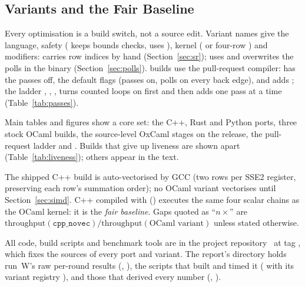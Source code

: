 \subsection{Variants and the Fair Baseline}
Every optimisation is a build switch, not a source edit. Variant names give
the language, safety ( keeps bounds checks,  uses
), kernel ( or four-row ) and
modifiers:  carries row indices by hand (Section~\ref{sec:sr});
 uses  and 
overwrites the polls in the binary (Section~\ref{sec:polls}). 
builds use the pull-request compiler:  has the passes off,
 the default flags (passes on, polls on every back edge), and
 adds ; the ladder
, , ,  turns
counted loops on first and then adds one pass at a time
(Table~\ref{tab:passes}).

Main tables and figures show a core set: the C++, Rust and Python ports,
three stock OCaml builds, the source-level OxCaml stages on the release, the
pull-request ladder and . Builds that give up liveness
are shown apart (Table~\ref{tab:liveness}); others appear in the text.

The shipped C++ build is auto-vectorised by GCC (two rows per SSE2 register,
preserving each row's summation order); no OCaml variant vectorises until
Section~\ref{sec:simd}. C++ compiled with 
() executes the same four scalar chains as the OCaml kernel:
it is the \emph{fair baseline}. Gaps quoted as ``$n\times$'' are
$\text{throughput}(\texttt{cpp\_novec}) / \text{throughput}(\text{OCaml variant})$
unless stated otherwise.

All code, build scripts and benchmark tools are in the project
repository~\cite{llamaport_repo} at tag , which fixes the
sources of every port and variant. The report's  directory holds
run~W's raw per-round results (, ),
the scripts that built and timed it ( with its variant
registry ), and those that derived every number
(, ).
